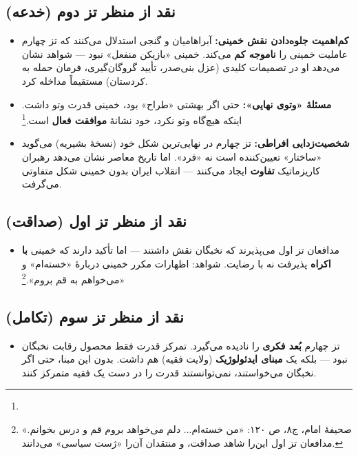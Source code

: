 \documentclass[12pt,a4paper]{book}
\newcommand{\keyword}[1]{\textbf{\textcolor{cPrimary}{#1}}}
\newcommand{\en}[1]{\lr{\textit{#1}}}
\begin{document}
\subsection{نقد از منظر تز دوم (خدعه)}

\begin{itemize}[label=\textcolor{cAccent}{$\times$}, rightmargin=2em]
    \item \textbf{کم‌اهمیت جلوه‌دادن نقش خمینی:} آبراهامیان و گنجی استدلال می‌کنند که تز چهارم عاملیت خمینی را \keyword{ناموجه کم} می‌کند. خمینی «بازیکن منفعل» نبود — شواهد نشان می‌دهد او در تصمیمات کلیدی (عزل بنی‌صدر، تأیید گروگان‌گیری، فرمان حمله به کردستان) مستقیماً مداخله کرد.
    
    \item \textbf{مسئلهٔ «وتوی نهایی»:} حتی اگر بهشتی «طراح» بود، خمینی قدرت وتو داشت. اینکه هیچ‌گاه وتو نکرد، خود نشانهٔ \keyword{موافقت فعال} است.\footnote{\en{Abrahamian (1993), pp.\,33--35.}}
    
    \item \textbf{شخصیت‌زدایی افراطی:} تز چهارم در نهایی‌ترین شکل خود (نسخهٔ بشیریه) می‌گوید «ساختار» تعیین‌کننده است نه «فرد». اما تاریخ معاصر نشان می‌دهد رهبران کاریزماتیک \keyword{تفاوت} ایجاد می‌کنند — انقلاب ایران بدون خمینی شکل متفاوتی می‌گرفت.
\end{itemize}

\subsection{نقد از منظر تز اول (صداقت)}

\begin{itemize}[label=\textcolor{cGreen}{$\times$}, rightmargin=2em]
    \item مدافعان تز اول می‌پذیرند که نخبگان نقش داشتند — اما تأکید دارند که خمینی \keyword{با اکراه} پذیرفت نه با رضایت. شواهد: اظهارات مکرر خمینی دربارهٔ «خسته‌ام» و «می‌خواهم به قم بروم».\footnote{صحیفهٔ امام، ج۸، ص ۱۲۰: «من خسته‌ام... دلم می‌خواهد بروم قم و درس بخوانم.» مدافعان تز اول این‌را شاهد صداقت، و منتقدان آن‌را «ژست سیاسی» می‌دانند.}
\end{itemize}

\subsection{نقد از منظر تز سوم (تکامل)}

\begin{itemize}[label=\textcolor{cGold}{$\times$}, rightmargin=2em]
    \item تز چهارم \keyword{بُعد فکری} را نادیده می‌گیرد. تمرکز قدرت فقط محصول رقابت نخبگان نبود — بلکه یک \keyword{مبنای ایدئولوژیک} (ولایت فقیه) هم داشت. بدون این مبنا، حتی اگر نخبگان می‌خواستند، نمی‌توانستند قدرت را در دست یک فقیه متمرکز کنند.
\end{itemize}
\end{document}
